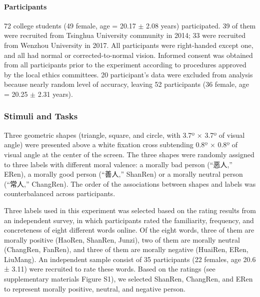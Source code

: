 \documentclass[
  english,
  man]{apa6}
\let\oldparagraph\paragraph
\renewcommand{\paragraph}[1]{\oldparagraph{#1}\mbox{}}
\begin{document}
\hypertarget{participants-1}{%
\paragraph{Participants}\label{participants-1}}

72 college students (49 female, age = 20.17 \(\pm\) 2.08 years) participated. 39 of them were recruited from Tsinghua University community in 2014; 33 were recruited from Wenzhou University in 2017. All participants were right-handed except one, and all had normal or corrected-to-normal vision. Informed consent was obtained from all participants prior to the experiment according to procedures approved by the local ethics committees. 20 participant's data were excluded from analysis because nearly random level of accuracy, leaving 52 participants (36 female, age = 20.25 \(\pm\) 2.31 years).

\hypertarget{stimuli-and-tasks-1}{%
\subsubsection{Stimuli and Tasks}\label{stimuli-and-tasks-1}}

Three geometric shapes (triangle, square, and circle, with 3.7º × 3.7º of visual angle) were presented above a white fixation cross subtending 0.8º × 0.8º of visual angle at the center of the screen. The three shapes were randomly assigned to three labels with different moral valence: a morally bad person (``恶人,'' ERen), a morally good person (``善人,'' ShanRen) or a morally neutral person (``常人,'' ChangRen). The order of the associations between shapes and labels was counterbalanced across participants.

Three labels used in this experiment was selected based on the rating results from an independent survey, in which participants rated the familiarity, frequency, and concreteness of eight different words online. Of the eight words, three of them are morally positive (HaoRen, ShanRen, Junzi), two of them are morally neutral (ChangRen, FanRen), and three of them are morally negative (HuaiRen, ERen, LiuMang). An independent sample consist of 35 participants (22 females, age 20.6 ± 3.11) were recruited to rate these words. Based on the ratings (see supplementary materials Figure S1), we selected ShanRen, ChangRen, and ERen to represent morally positive, neutral, and negative person.
\end{document}

